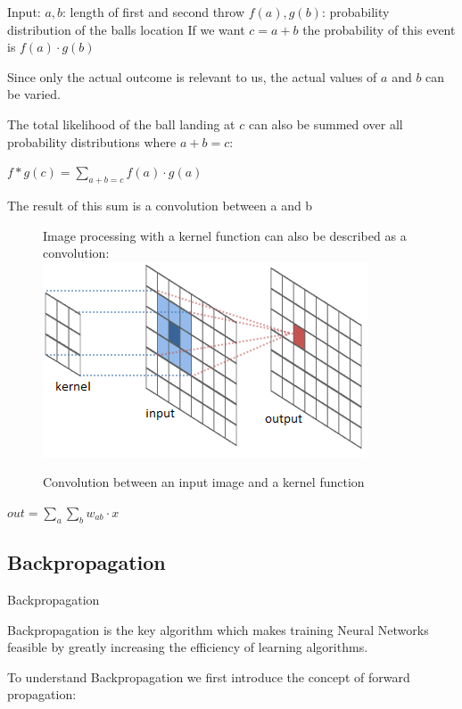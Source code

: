 \documentclass[12pt]{beamer}
\begin{document}
\begin{frame}
Input: \newline
$a, b$: length of first and second throw
$f(a), g(b)$: probability distribution of the balls location
If we want $c = a + b$ the probability of this event is $f(a) \cdot g(b)$

Since only the actual outcome is relevant to us, the actual values of $a$ and $b$ can be varied.

The total likelihood of the ball landing at $c$ can also be summed over all probability distributions where $a+b=c$:

$f*g(c) = \sum_{a+b=c} {f(a) \cdot g(a)} $

The result of this sum is a convolution between a and b
\end{frame}

\begin{frame}

\begin{figure}
\centering
Image processing with a kernel function can also be described as a convolution:
\includegraphics[width = 0.4\linewidth]{images/Kernelfunction.png}
\caption{Convolution between an input image and a kernel function}
\label{fig:principle}
\end{figure}

$out = \sum_{a} \sum_{b} w_{ab} \cdot x $



\end{frame}



\subsection{Backpropagation}
\begin{frame}{Backpropagation}

Backpropagation is the key algorithm which makes training Neural Networks feasible by greatly increasing the efficiency of learning algorithms.

To understand Backpropagation we first introduce the concept of forward propagation:

\end{frame}
\end{document}
